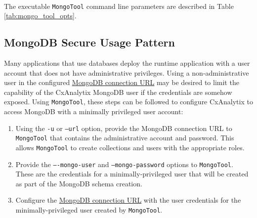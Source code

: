 \noindent\\The executable \texttt{MongoTool} command line parameters are described in Table \ref{tab:mongo_tool_opts}.  


\subsection{MongoDB Secure Usage Pattern}

Many applications that use databases deploy the runtime application with a user account that does
not have administrative privileges.  Using a non-administrative user in the configured
\hyperref[sec:mongo_config]{MongoDB connection URL} may be desired to limit the capability
of the CxAnalytix MongoDB user if the credentials are somehow exposed. Using \texttt{MongoTool},
these steps can be followed to configure CxAnalytix to access MongoDB with a minimally privileged
user account:

\begin{enumerate}
    \item Using the \texttt{-u} or \texttt{--url} option, provide the MongoDB connection
    URL to \texttt{MongoTool} that contains the administrative account and password.
    This allows \texttt{MongoTool} to create collections and users with the appropriate roles.

    \item Provide the \texttt{----mongo-user} and \texttt{--mongo-password} options
    to \texttt{MongoTool}.  These are the credentials for a minimally-privileged user
    that will be created as part of the MongoDB schema creation.

    \item Configure the \hyperref[sec:mongo_config]{MongoDB connection URL} with the
    user credentials for the minimally-privileged user created by \texttt{MongoTool}.
\end{enumerate}


